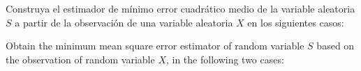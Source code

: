 \ifspanish

\question  Construya el estimador de mínimo error cuadrático medio de la variable aleatoria $S$ a partir de la observación de una variable aleatoria $X$ en los siguientes casos:

\begin{parts}
\part 
\[
p_{X,S}(x,s) = \left \{
  \begin{array}{cc}
    1, &
         0 \le x \le 1, ~~ \quad 0\le s \le 1 \\
0,  & \mbox{en el resto}
  \end{array}
\right.
\]
  \part 

\[
p_{X,S}(x,s) = \left \{
  \begin{array}{cc}
    2, &  0 \leq s \leq 1-x, ~~ 0 \leq x \leq 1 \\
0, & \mbox{en el resto}
  \end{array}
\right.
\]
\end{parts}

\else

\question Obtain the minimum mean square error estimator of random variable $S$ based on the observation of random variable $X$, in the following two cases:

\begin{parts}
\part 
\[
p_{X,S}(x,s) = \left \{
    \begin{array}{cc}
    1, & 0 \le x \le 1, ~~ \quad 0\le s \le 1 \\
    0, & \mbox{otherwise}
    \end{array}
\right.
\]

\part 
\[
p_{X,S}(x,s) = \left \{
  \begin{array}{cc}
    2, &  0 \leq s \leq 1-x, ~~ 0 \leq x \leq 1 \\
    0, & \mbox{otherwise}
  \end{array}
\right.
\]
\end{parts}

\fi


\begin{solution}
\end{solution}

